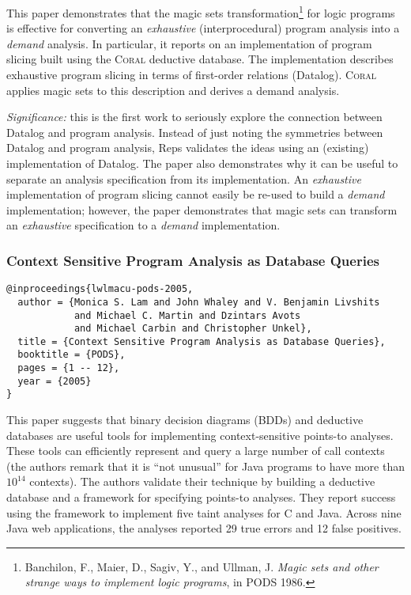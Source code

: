 \documentclass{article}
\begin{document}
This paper demonstrates that the magic sets transformation\footnote{Banchilon, F., Maier, D., Sagiv, Y., and Ullman, J. \emph{Magic sets and other strange ways to implement logic programs}, in PODS 1986.} for logic programs is effective for converting an \emph{exhaustive} (interprocedural) program analysis into a \emph{demand} analysis.
In particular, it reports on an implementation of program slicing built using the \textsc{Coral} deductive database.
The implementation describes exhaustive program slicing in terms of first-order relations (Datalog).
\textsc{Coral} applies magic sets to this description and derives a demand analysis.

\emph{Significance:} this is the first work to seriously explore the connection between Datalog and program analysis.
Instead of just noting the symmetries between Datalog and program analysis, Reps validates the ideas using an (existing) implementation of Datalog.
The paper also demonstrates why it can be useful to separate an analysis specification from its implementation.
An \emph{exhaustive} implementation of program slicing cannot easily be re-used to build a \emph{demand} implementation; however, the paper demonstrates that magic sets can transform an \emph{exhaustive} specification to a \emph{demand} implementation.


\newpage
\subsubsection*{Context Sensitive Program Analysis as Database Queries}
\begin{verbatim}
@inproceedings{lwlmacu-pods-2005,
  author = {Monica S. Lam and John Whaley and V. Benjamin Livshits
            and Michael C. Martin and Dzintars Avots
            and Michael Carbin and Christopher Unkel},
  title = {Context Sensitive Program Analysis as Database Queries},
  booktitle = {PODS},
  pages = {1 -- 12},
  year = {2005}
}
\end{verbatim}

This paper suggests that binary decision diagrams (BDDs) and deductive databases are useful tools for implementing context-sensitive points-to analyses.
These tools can efficiently represent and query a large number of call contexts (the authors remark that it is ``not unusual'' for Java programs to have more than $10^{14}$ contexts).
The authors validate their technique by building a deductive database and a framework for specifying points-to analyses.
They report success using the framework to implement five taint analyses for C and Java.
Across nine Java web applications, the analyses reported 29 true errors and 12 false positives.
\end{document}
